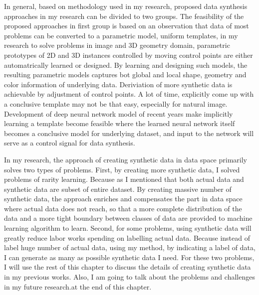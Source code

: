 \documentclass{iitthesis}
\begin{document}
In general, based on methodology used in my research, proposed data synthesis approaches in my research can be divided to two groups. The feasibility of the proposed approaches in first group is based on an observation that data of most problems can be converted to a parametric model, uniform templates, in my research to solve problems in image and 3D geometry domain, parametric prototypes of 2D and 3D instances controlled by moving control points are either automatrically learned or designed. By learning and designing such models, the resulting parametric models captures bot global and local shape, geometry and color information of underlying data. Deriviation of more synthetic data is achievable by adjustment of control points. A lot of time, explicitly come up with a conclusive template may not be that easy, especially for natural image. Development of deep neural network model of recent years make implicitly learning a template become feasible where the learned neural network itself becomes a conclusive model for underlying dataset, and input to the network will serve as a control signal for data synthesis.

In my research, the approach of creating synthetic data in data space primarily solves two types of problems. First, by creating more synthetic data, I solved problems of rarity learning. Because as I mentioned that both actual data and synthetic data are subset of entire dataset. By creating massive number of synthetic data, the approach enriches and compensates the part in data space where actual data does not reach, so that a more complete distribution of the data and a more tight boundary between classes of data are provided to machine learning algorithm to learn. Second, for some problems, using synthetic data will greatly reduce labor works spending on labelling actual data. Because instead of label huge number of actual data, using my method, by indicating a label of data, I can generate as many as possible synthetic data I need. For these two problems, I will use the rest of this chapter to discuss the details of creating synthetic data in my previous works. Also, I am going to talk about the problems and challenges in my future research.at the end of this chapter.
\end{document}
